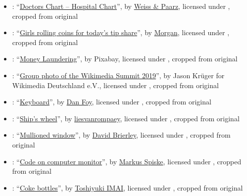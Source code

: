 \begin{itemize}
\item {}: ``\href{https://www.flickr.com/photos/141290938@N03/26682727064/}{Doctors Chart -- Hospital Chart}'', by \href{http://www.weisspaarz.com/}{Weiss \& Paarz}, licensed under , cropped from original

\item {}: ``\href{https://www.flickr.com/photos/meddygarnet/4423075785/}{Girls rolling coins for today's tip share}'', by \href{https://www.flickr.com/people/meddygarnet/}{Morgan}, licensed under , cropped from original

\item {}: ``\href{https://commons.wikimedia.org/wiki/File:Money_in_notes.jpg}{Money Laundering}'', by Pixabay, licensed under , cropped from original

\item {}: ``\href{https://commons.wikimedia.org/wiki/File:Wikimedia_Summit_2019_-_Group_photo_1.jpg}{Group photo of the Wikimedia Summit 2019}'', by Jason Krüger for Wikimedia Deutschland e.V., licensed under , cropped from original

\item {}: ``\href{https://www.flickr.com/photos/orangeacid/204145200/}{Keyboard}'', by \href{https://www.flickr.com/people/orangeacid/}{Dan Foy}, licensed under , cropped from original

\item {}: ``\href{https://www.flickr.com/photos/liesvanrompaey/4999951854/}{Ship's wheel}'', by \href{https://www.flickr.com/people/liesvanrompaey/}{liesvanrompaey}, licensed under , cropped from original

\item {}: ``\href{https://www.flickr.com/photos/10413717@N08/9255897859/}{Mullioned window}'', by \href{https://www.flickr.com/people/10413717@N08/}{David Brierley}, licensed under , cropped from original

\item {}: ``\href{https://commons.wikimedia.org/wiki/File:Code_on_computer_monitor_(Unsplash).jpg}{Code on computer monitor}'', by \href{https://unsplash.com/@markusspiske}{Markus Spiske}, licensed under , cropped from original

\item {}: ``\href{https://commons.wikimedia.org/wiki/File:Coke_bottles_(336197108).jpg}{Coke bottles}'', by \href{https://www.flickr.com/people/12173213@N00}{Toshiyuki IMAI}, licensed under , cropped from original


\end{itemize}
